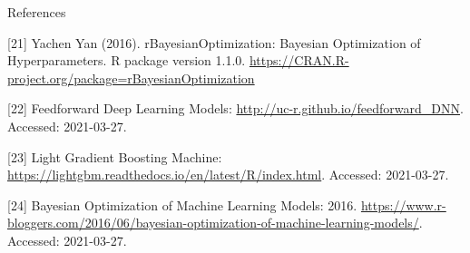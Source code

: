 \documentclass[12pt,ignorenonframetext,]{beamer}
\begin{document}
\begin{frame}{References}
\protect\hypertarget{references-2}{}

\tiny

{[}21{]} Yachen Yan (2016). rBayesianOptimization: Bayesian Optimization
of Hyperparameters. R package version 1.1.0.
\url{https://CRAN.R-project.org/package=rBayesianOptimization}

{[}22{]} Feedforward Deep Learning Models:
\url{http://uc-r.github.io/feedforward_DNN}. Accessed: 2021-03-27.

{[}23{]} Light Gradient Boosting Machine:
\url{https://lightgbm.readthedocs.io/en/latest/R/index.html}. Accessed:
2021-03-27.

{[}24{]} Bayesian Optimization of Machine Learning Models: 2016.
\url{https://www.r-bloggers.com/2016/06/bayesian-optimization-of-machine-learning-models/}.
Accessed: 2021-03-27.

\end{frame}

  
\end{document}
